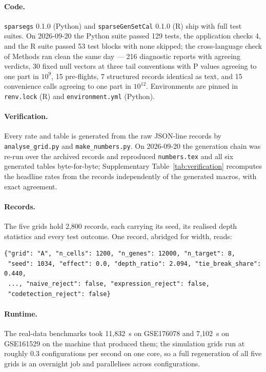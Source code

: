 \documentclass[11pt]{article}
\newcommand{\code}[1]{\texttt{#1}}
\begin{document}
\paragraph{Code.} \code{sparsegs} 0.1.0 (Python) and \code{sparseGenSetCal}
0.1.0 (R) ship with full test suites. On 2026-09-20 the Python suite passed
129 tests, the application checks 4, and the R suite passed 53 test blocks
with none skipped; the
cross-language check of Methods ran clean the same day --- 216 diagnostic
reports with agreeing verdicts, 30 fixed null vectors at three tail
conventions with P values agreeing to one part in $10^{9}$, 15 pre-flights,
7 structured records identical as text, and 15 convenience calls agreeing to
one part in $10^{12}$. Environments are pinned in \code{renv.lock} (R) and
\code{environment.yml} (Python).

\paragraph{Verification.} Every rate and table is generated from the raw
JSON-line records by \code{analyse\_grid.py} and \code{make\_numbers.py}. On
2026-09-20 the generation chain was re-run over the archived records and
reproduced \code{numbers.tex} and all six generated tables byte-for-byte;
Supplementary Table~\ref{tab:verification} recomputes the headline rates
from the records independently of the generated macros, with exact agreement.

\paragraph{Records.} The five grids hold 2{,}800 records, each carrying its
seed, its realised depth statistics and every test outcome. One record,
abridged for width, reads:

\begin{verbatim}
{"grid": "A", "n_cells": 1200, "n_genes": 12000, "n_target": 8,
 "seed": 1034, "effect": 0.0, "depth_ratio": 2.094, "tie_break_share": 0.440,
 ..., "naive_reject": false, "expression_reject": false,
 "codetection_reject": false}
\end{verbatim}

\paragraph{Runtime.} The real-data benchmarks took 11{,}832~s on GSE176078
and 7{,}102~s on GSE161529 on the machine that produced them; the simulation
grids run at roughly 0.3 configurations per second on one core, so a full
regeneration of all five grids is an overnight job and parallelises across
configurations.
\end{document}

